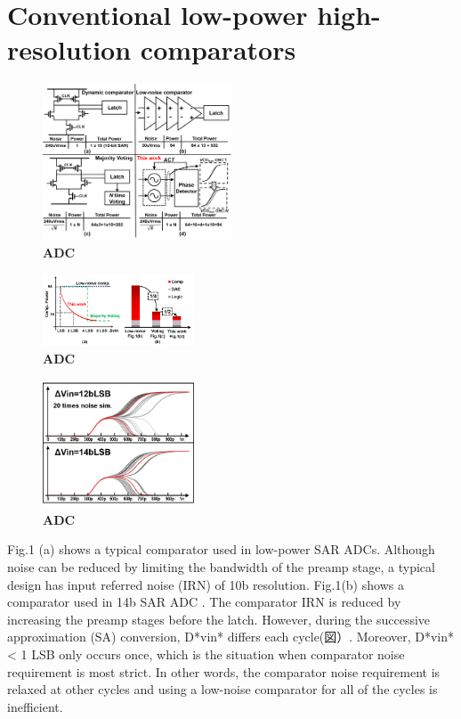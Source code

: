 \documentclass[letterpaper, 10 pt, conference]{ieeeconf}  %
\begin{document}
\section{Conventional low-power high-resolution comparators}
\begin{figure}[ht!]
\centering
 \includegraphics[width=0.5\textwidth]{figs/fig1_r1.png}
  \captionsetup{font=footnotesize}
  \caption{\textbf{ADC}}
  \label{highlight}
\end{figure}
\begin{figure}[ht!]
\centering
 \includegraphics[width=0.4\textwidth]{figs/fig2.png}
  \captionsetup{font=footnotesize}
  \caption{\textbf{ADC}}
  \label{highlight}
\end{figure}
\begin{figure}[ht!]
\centering
 \includegraphics[width=0.4\textwidth]{figs/conventional-strongarm.png}
  \captionsetup{font=footnotesize}
  \caption{\textbf{ADC}}
  \label{highlight}
\end{figure}

Fig.1 (a) shows a typical comparator \cite{miyahara2008low} used in low-power SAR ADCs. Although noise can be reduced by limiting the bandwidth of the preamp stage, a typical design has input referred noise (IRN) of 10b resolution. Fig.1(b) shows a comparator used in 14b SAR ADC \cite{hesener200714b}. The comparator IRN is reduced by increasing the preamp stages before the latch. However, during the successive approximation (SA) conversion, D*vin* differs each cycle(図）. Moreover, D*vin* < 1 LSB only occurs once, which is the situation when comparator noise requirement is most strict. In other words, the comparator noise requirement is relaxed at other cycles and using a low-noise comparator for all of the cycles is inefficient. 
\end{document}
